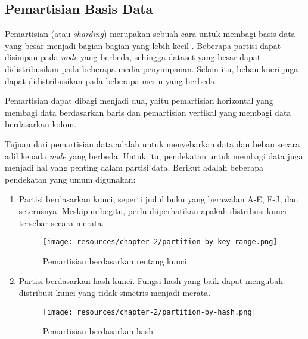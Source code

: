 \subsection{Pemartisian Basis Data}

Pemartisian (atau \textit{sharding}) merupakan sebuah cara untuk membagi basis data yang besar menjadi bagian-bagian yang lebih kecil \parencite{dataIntensiveApplications}. Beberapa partisi dapat disimpan pada \textit{node} yang berbeda, sehingga dataset yang besar dapat didistribusikan pada beberapa media penyimpanan. Selain itu, beban kueri juga dapat didistribusikan pada beberapa mesin yang berbeda.

Pemartisian dapat dibagi menjadi dua, yaitu pemartisian horizontal yang membagi data berdasarkan baris dan pemartisian vertikal yang membagi data berdasarkan kolom.

Tujuan dari pemartisian data adalah untuk menyebarkan data dan beban secara adil kepada \textit{node} yang berbeda. Untuk itu, pendekatan untuk membagi data juga menjadi hal yang penting dalam partisi data. Berikut adalah beberapa pendekatan yang umum digunakan:

\begin{enumerate}
    \item Partisi berdasarkan kunci, seperti judul buku yang berawalan A-E, F-J, dan seterusnya. Meskipun begitu, perlu diiperhatikan apakah distribusi kunci tersebar secara merata.
          \pagebreak
          \begin{figure}[htbp]
              \centering
              \texttt{[image: resources/chapter-2/partition-by-key-range.png]}
              \caption{Pemartisian berdasarkan rentang kunci \parencite{dataIntensiveApplications}}
              \label{fig: partition-by-key-range}
          \end{figure}

    \item Partisi berdasarkan hash kunci. Fungsi hash yang baik dapat mengubah distribusi kunci yang tidak simetris menjadi merata.
          \begin{figure}[htbp]
              \centering
              \texttt{[image: resources/chapter-2/partition-by-hash.png]}
              \caption{Pemartisian berdasarkan hash \parencite{dataIntensiveApplications}}
              \label{fig:partition-by-hash}
          \end{figure}

\end{enumerate}